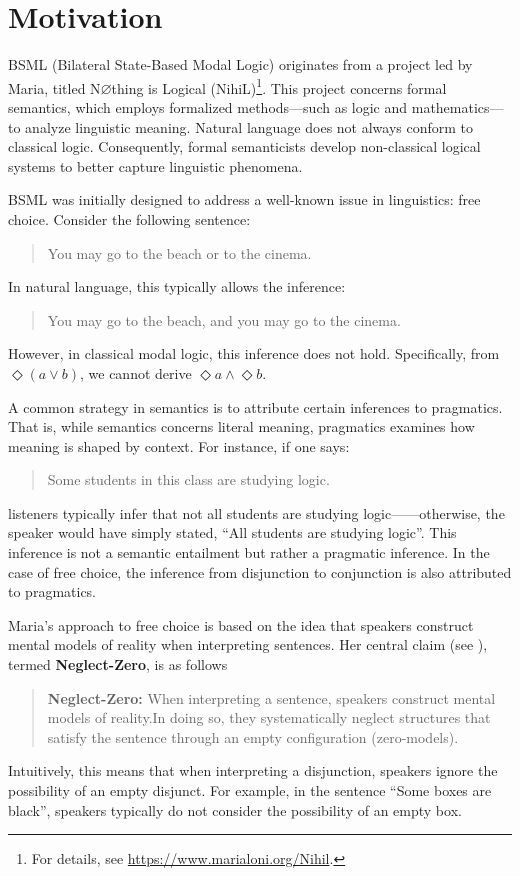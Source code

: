 \section{Motivation}\label{Motivation}

BSML (Bilateral State-Based Modal Logic) originates from a project led by Maria, 
titled N$\varnothing$thing is Logical (NihiL)\footnote{For details, see \url{https://www.marialoni.org/Nihil}.}. 
This project concerns formal semantics, which employs formalized methods—such as logic and mathematics—to analyze linguistic meaning. 
Natural language does not always conform to classical logic. Consequently, formal semanticists develop non-classical logical systems to better capture linguistic phenomena.

BSML was initially designed to address a well-known issue in linguistics: free choice. Consider the following sentence:

\begin{quote}
    You may go to the beach or to the cinema.
\end{quote}

In natural language, this typically allows the inference:

\begin{quote}
    You may go to the beach, and you may go to the cinema.
\end{quote}

However, in classical modal logic, this inference does not hold. Specifically, from $\Diamond (a \vee b)$, we cannot derive $\Diamond a \land \Diamond b$.

A common strategy in semantics is to attribute certain inferences to pragmatics. 
That is, while semantics concerns literal meaning, pragmatics examines how meaning is shaped by context. For instance, if one says:

\begin{quote}
    Some students in this class are studying logic.
\end{quote}

listeners typically infer that not all students are studying logic——otherwise, the speaker would have simply stated, ``All students are studying logic''.
This inference is not a semantic entailment but rather a pragmatic inference.
In the case of free choice, the inference from disjunction to conjunction is also attributed to pragmatics.

Maria's approach to free choice is based on the idea that speakers construct mental models of reality when interpreting sentences. Her central claim (see \citet{Aloni2022}), termed \textbf{Neglect-Zero}, is as follows
\begin{quote}
    \textbf{Neglect-Zero:} 
     When interpreting a sentence, speakers construct mental models of reality.In doing so, they systematically neglect structures that satisfy the sentence through an empty configuration (zero-models).
    
\end{quote}
Intuitively, this means that when interpreting a disjunction, speakers ignore the possibility of an empty disjunct. For example, in the sentence ``Some boxes are black'', speakers typically do not consider the possibility of an empty box.


